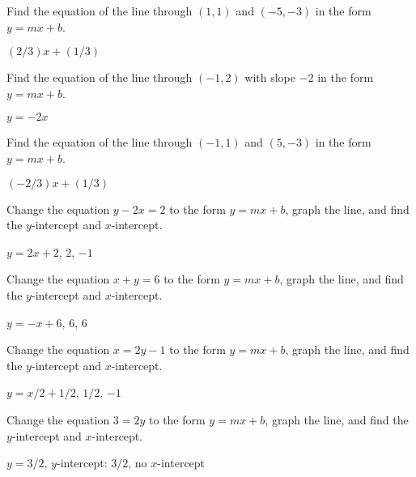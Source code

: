 \begin{exercises}

\begin{exercise} Find the equation of the line through $(1,1)$ and $(-5, -3)$ in
the form $y=mx+b$.
\begin{answer} $(2/3)x+(1/3)$
\end{answer}\end{exercise}

\begin{exercise} Find the equation of the line through $(-1,2)$ with slope $-2$ in
the form $y=mx+b$.
\begin{answer} $y=-2x$
\end{answer}\end{exercise}

\begin{exercise} Find the equation of the line through $(-1,1)$ and $(5, -3)$ in
the form $y=mx+b$.
\begin{answer} $(-2/3)x+(1/3)$
\end{answer}\end{exercise}


\begin{exercise} Change the equation $y-2x=2$ to the form $y=mx+b$, graph the
line, and find the $y$-intercept and $x$-intercept.
\begin{answer} $y=2x+2$, 2, $-1$
\end{answer}\end{exercise}

\begin{exercise} Change the equation $x+y=6$ to the form $y=mx+b$, graph the
line, and find the $y$-intercept and $x$-intercept.
\begin{answer} $y=-x+6$, 6, 6
\end{answer}\end{exercise}


\begin{exercise} Change the equation $x=2y-1$ to the form $y=mx+b$, graph the
line, and find the $y$-intercept and $x$-intercept.
\begin{answer} $y=x/2+1/2$, $1/2$, $-1$
\end{answer}\end{exercise}

\begin{exercise} Change the equation $3=2y$ to the form $y=mx+b$, graph the
line, and find the $y$-intercept and $x$-intercept.
\begin{answer} $y=3/2$, $y$-intercept: $3/2$, no $x$-intercept
\end{answer}\end{exercise}



\end{exercises}
